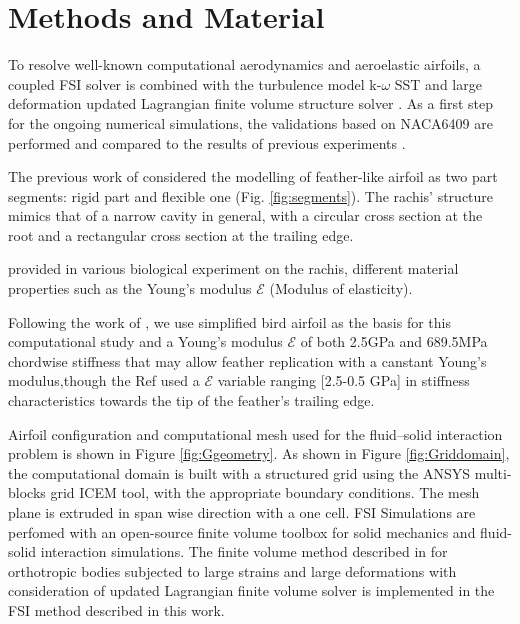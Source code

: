 \section{Methods and Material}

To resolve well-known computational aerodynamics and aeroelastic airfoils, a coupled FSI solver is combined with the turbulence model k-$\omega$ SST and large deformation updated Lagrangian finite volume structure solver \cite{Cardiff2014AOrientations}. As a first step for the ongoing numerical simulations, the validations based on NACA6409 are performed and compared to the results of previous experiments \cite{Gamble2020a}.



The previous work of \citet{Gamble2020b} considered the modelling of feather-like airfoil as two part segments: rigid part and flexible one (Fig. \ref{fig:segments}). The rachis' structure mimics that of a narrow cavity in general, with a circular cross section at the root and a rectangular cross section at the trailing edge.

\citet{Bachmann2012FlexuralProperties} provided in various biological experiment on the rachis, different material properties such as the Young's modulus $\mathcal{E}$ (Modulus of elasticity).

Following the work of \cite{Gamble2020a}, we use simplified bird airfoil as the basis for this computational study and a Young's modulus $\mathcal{E}$ of both 2.5GPa and  689.5MPa chordwise stiffness that may allow feather replication with a canstant Young’s modulus,though the Ref \cite{Gamble2020b} used a $\mathcal{E}$ variable ranging [2.5-0.5 GPa] in stiffness characteristics towards the tip of the feather’s trailing edge.

Airfoil conﬁguration and computational mesh used for the ﬂuid–solid interaction problem is shown in Figure \ref{fig:Ggeometry}. As shown in Figure \ref{fig:Griddomain}, the computational domain is built with a structured grid using the ANSYS multi-blocks grid ICEM tool, with the appropriate boundary conditions. The mesh plane is extruded in span wise direction with a one cell.
FSI Simulations are perfomed with an open-source finite volume toolbox for solid mechanics and fluid-solid interaction simulations. The finite volume method described in \citet{Cardiff2018} for orthotropic bodies subjected to large strains and large deformations with consideration of updated Lagrangian finite volume solver \cite{tukovic2014openfoam} is implemented in the FSI method described in this work. 

